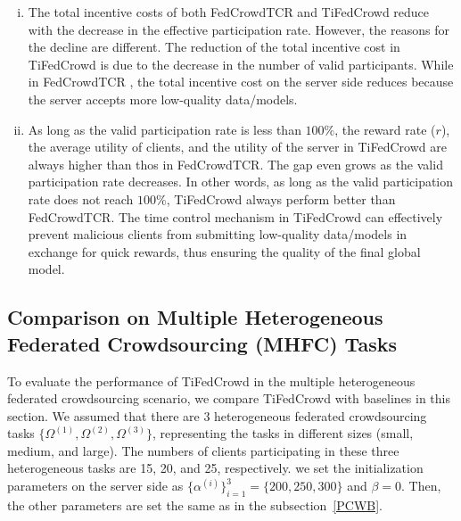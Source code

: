 \documentclass[final,1p,times]{elsarticle}
\begin{document}
\begin{enumerate}[(i)]
	\item The total incentive costs of both FedCrowdTCR and TiFedCrowd reduce with the decrease in the effective participation rate. However, the reasons for the decline are different. The reduction of the total incentive cost in TiFedCrowd is due to the decrease in the number of valid participants. While in FedCrowdTCR , the total incentive cost on the server side reduces because the server accepts more low-quality data/models.
	\item As long as the valid participation rate is less than $100\%$, the reward rate ($r$), the average utility of clients, and the utility of the server in TiFedCrowd are always higher than thos in FedCrowdTCR. The gap even grows as the valid participation rate decreases. In other words, as long as the valid participation rate does not reach $100\%$, TiFedCrowd always perform better than FedCrowdTCR. The time control mechanism in TiFedCrowd can effectively prevent malicious clients from submitting low-quality data/models in exchange for quick rewards, thus ensuring the quality of the final global model.
\end{enumerate}

\subsection{Comparison on Multiple Heterogeneous Federated Crowdsourcing (MHFC) Tasks} \label{MHFC}
To evaluate the performance of TiFedCrowd in the multiple heterogeneous federated crowdsourcing scenario, we compare TiFedCrowd with baselines in this section. We assumed that there are 3 heterogeneous federated crowdsourcing tasks $\{\Omega^{(1)},\Omega^{(2)},\Omega^{(3)}\}$, representing the tasks in different sizes (small, medium, and large). The numbers of clients participating in these three heterogeneous tasks are 15, 20, and 25, respectively. we set the initialization parameters on the server side as $\{\alpha^{(i)}\}_{i=1}^3 = \{200, 250, 300\}$ and $\beta=0$. Then, the other parameters are set the same as in the subsection~\ref{PCWB}.
\end{document}
